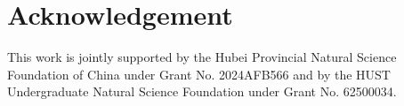 \section*{Acknowledgement}

This work is jointly supported by the Hubei Provincial Natural Science Foundation of China under Grant No. 2024AFB566 and by the HUST Undergraduate Natural Science Foundation under Grant No. 62500034.
